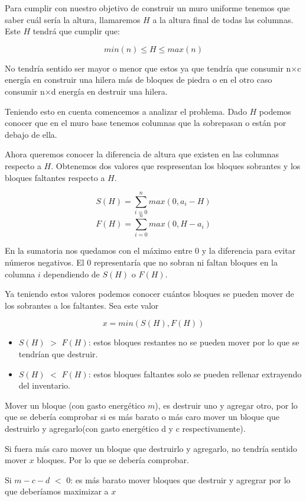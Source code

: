\documentclass[a4paper,12pt]{article}
\begin{document}
Para cumplir con nuestro objetivo de construir un muro uniforme tenemos que saber cuál sería la altura, llamaremos \(H\) a la altura final de todas las columnas.
Este \(H\) tendrá que cumplir que:

\[min(n) \leq H \leq max(n)\]

No tendría sentido ser mayor o menor que estos ya que tendría que consumir n$\times$c energía en construir una hilera más de bloques de piedra o en el otro caso consumir n$\times$d energía en destruir una hilera.

Teniendo esto en cuenta comencemos a analizar el problema.
Dado \(H\) podemos conocer que en el muro base tenemos columnas que la sobrepasan o están por debajo de ella.

Ahora queremos conocer la diferencia de altura que existen en las columnas respecto a \(H\). Obtenemos dos valores que respresentan los bloques sobrantes y los bloques faltantes respecto a \(H\).

\[S(H) = \sum_{i=0}^{n} max(0,a_i - H)\]
\[F(H) = \sum_{i=0}^{n} max(0,H - a_i)\]

En la sumatoria nos quedamos con el máximo entre 0 y la diferencia para evitar números negativos. El 0 representaría que no sobran ni faltan bloques en la columna \(i\) dependiendo de \(S(H)\) o \(F(H)\).

Ya teniendo estos valores podemos conocer cuántos bloques se pueden mover de los sobrantes a los faltantes. Sea este valor

\[x=min(S(H),F(H))\]

\begin{itemize}
	\item \(S(H)\) $>$ \(F(H)\): estos bloques restantes no se pueden mover por lo que se tendrían que destruir.
	\item \(S(H)\) $<$ \(F(H)\): estos bloques faltantes solo se pueden rellenar extrayendo del inventario.
\end{itemize}

Mover un bloque (con gasto energético \(m\)), es destruir uno y agregar otro, por lo que se debería comprobar si es más barato o más caro mover un bloque que destruirlo y agregarlo(con gasto energético d y c respectivamente).

Si fuera más caro mover un bloque que destruirlo y agregarlo, no tendría sentido mover \(x\) bloques. Por lo que se debería comprobar.

Si \(m - c - d \) $<$ \(0\): es más barato mover bloques que destruir y agregrar por lo que deberíamos maximizar a \(x\)
\end{document}
